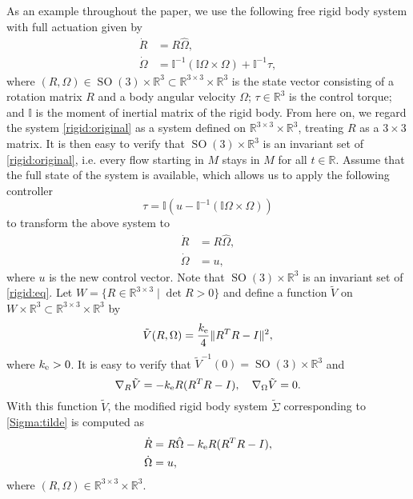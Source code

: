 \documentclass[letterpaper, 10 pt, conference]{ieeeconf}  %
\newcommand{\SO}{\operatorname{SO}(3)}
\newcommand{\MI}{{\mathbb I}}
\newcommand{\coV}{{k_{\rm e}}}
\begin{document}
As an example throughout the paper, we use the following  free rigid body system with full actuation given by
\begin{subequations}\label{rigid:original}
\begin{align}
\dot R &= R\hat \Omega, \\
\dot \Omega &= \MI^{-1} ( \MI \Omega \times \Omega) + \MI^{-1} \tau,
\end{align}
\end{subequations}
where $(R,\Omega) \in \SO \times  \mathbb R^3 \subset \mathbb R^{3\times 3} \times \mathbb R^3$ is the state vector consisting of a rotation matrix $R$ and a body angular velocity $\Omega$; $\tau \in \mathbb R^3$ is the control torque; and $\mathbb I$ is the moment of inertial matrix of the rigid body. From here on, we regard the system \eqref{rigid:original} as a system defined on  $\mathbb R^{3\times 3} \times \mathbb R^3$, treating $R$ as a $3\times 3$ matrix.  It is then easy to verify that $\SO \times \mathbb R^3$ is an invariant set of \eqref{rigid:original}, i.e. every flow starting in $M$ stays in $M$ for all $t\in \mathbb R$.
Assume that the full state of the system is available, which allows us to apply the following controller 
\[
\tau = \MI (u - \MI^{-1}(\MI \Omega \times \Omega))
\]
to transform the above system to
\begin{subequations}\label{rigid:eq}
\begin{align}
\dot R &= R\hat \Omega, \label{R:eq}\\
\dot \Omega &= u, \label{Omega:eq}
\end{align}
\end{subequations}
where $u$ is the new control vector. Note that $\SO \times \mathbb R^3$ is an invariant set of \eqref{rigid:eq}.  Let $W = \{ R \in \mathbb R^{3\times 3} \mid \det R >0\}$ and define a function $\tilde V$ on $W \times \mathbb R^3\subset \mathbb R^{3\times 3} \times\mathbb R^3$ by 
\[
\tilde V(R,\Omega) = \frac{\coV }{4}\|R^TR - I\|^2,
\]
where $\coV >0$. It is easy to verify that $\tilde V^{-1}(0) = \SO\times \mathbb R^3$ and 
\[
\nabla_R \tilde V = -\coV  R(R^TR - I), \quad \nabla_\Omega \tilde V = 0.
\]
With this function $\tilde V$,  the modified rigid body system $\tilde \Sigma$ corresponding to \eqref{Sigma:tilde} is computed as
\begin{subequations}\label{rigid:tilde:eq}
\begin{align}
\dot R &= R\hat \Omega - \coV R(R^TR - I), \label{R:s:eq}\\
\dot \Omega &= u, \label{Omega:s:eq}
\end{align}
\end{subequations}
where $(R,\Omega) \in \mathbb R^{3\times 3} \times \mathbb R^3$.
\end{document}
